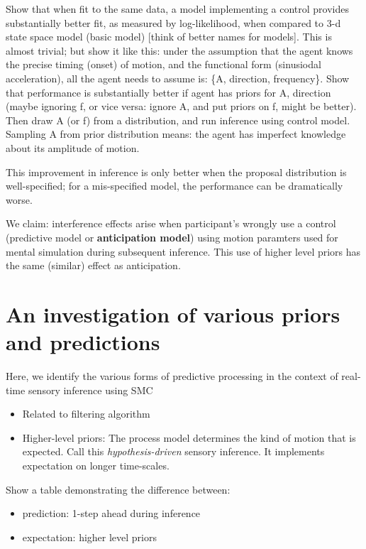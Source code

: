 \documentclass[english,floatsintext,man]{apa6}
\providecommand{\tightlist}{%
  \setlength{\itemsep}{0pt}\setlength{\parskip}{0pt}}
\theoremstyle{definition}
\theoremstyle{definition}
\theoremstyle{remark}
\begin{document}
Show that when fit to the same data, a model implementing a control
provides substantially better fit, as measured by log-likelihood, when
compared to 3-d state space model (basic model) {[}think of better names
for models{]}. This is almost trivial; but show it like this: under the
assumption that the agent knows the precise timing (onset) of motion,
and the functional form (sinusiodal acceleration), all the agent needs
to assume is: \{A, direction, frequency\}. Show that performance is
substantially better if agent has priors for A, direction (maybe
ignoring f, or vice versa: ignore A, and put priors on f, might be
better). Then draw A (or f) from a distribution, and run inference using
control model. Sampling A from prior distribution means: the agent has
imperfect knowledge about its amplitude of motion.

This improvement in inference is only better when the proposal
distribution is well-specified; for a mis-specified model, the
performance can be dramatically worse.

We claim: interference effects arise when participant's wrongly use a
control (predictive model or \textbf{anticipation model}) using motion
paramters used for mental simulation during subsequent inference. This
use of higher level priors has the same (similar) effect as
anticipation.

\section{An investigation of various priors and
predictions}\label{an-investigation-of-various-priors-and-predictions}

Here, we identify the various forms of predictive processing in the
context of real-time sensory inference using SMC

\begin{itemize}
\tightlist
\item
  Related to filtering algorithm
\item
  Higher-level priors: The process model determines the kind of motion
  that is expected. Call this \emph{hypothesis-driven} sensory
  inference. It implements expectation on longer time-scales.
\end{itemize}

Show a table demonstrating the difference between:

\begin{itemize}
\tightlist
\item
  prediction: 1-step ahead during inference
\item
  expectation: higher level priors
\end{itemize}
\end{document}
